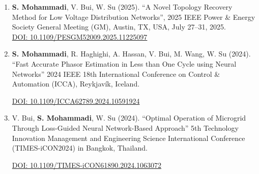 \documentclass[a4paper,8pt]{article}
\begin{document}
\begin{itemize}
\begin{enumerate}
        \item 
	    \textbf{S. Mohammadi}, V. Bui, W. Su (2025). “A Novel Topology Recovery Method for Low Voltage Distribution Networks”, 2025 IEEE Power \& Energy Society General Meeting (GM), Austin, TX, USA, July 27–31, 2025.\\
        \href{https://doi.org/10.1109/PESGM52009.2025.11225097}{DOI: 10.1109/PESGM52009.2025.11225097}
         
      \item
	    \textbf{S. Mohammadi}, R. Haghighi, A. Hassan, V. Bui, M. Wang, W. Su (2024). “Fast Accurate Phasor Estimation in Less than One Cycle using Neural Networks” 2024 IEEE 18th International Conference on Control \& Automation (ICCA), Reykjavík, Iceland.
        
    \href{https://doi.org/10.1109/ICCA62789.2024.10591924}{DOI: 10.1109/ICCA62789.2024.10591924}

     \item
	    V. Bui, \textbf{S. Mohammadi}, W. Su (2024). “Optimal Operation of Microgrid Through Loss-Guided Neural Network-Based Approach” 5th Technology Innovation Management and Engineering Science International Conference (TIMES-iCON2024) in Bangkok, Thailand.

        \href{https://doi.org/10.1109/TIMES-iCON61890.2024.10630727}{DOI: 10.1109/TIMES-iCON61890.2024.1063072}
	

\end{enumerate}
\end{itemize}
\end{document}
